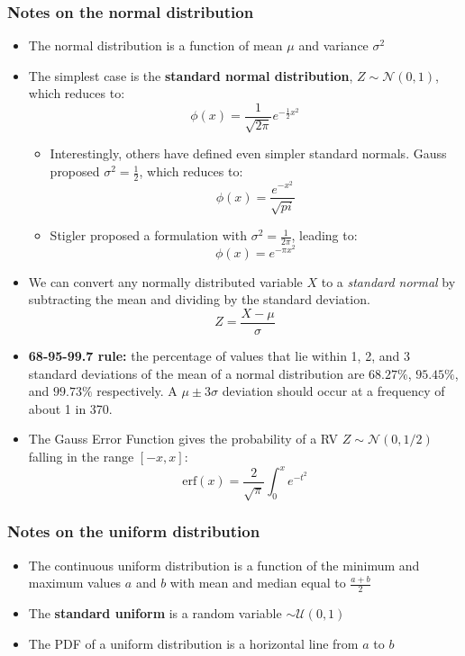 \documentclass{article}
\begin{document}
\begin{multicols*}{2}
\begin{itemize}
\end{itemize}

\subsubsection{Notes on the normal distribution}
\begin{itemize}
    \item The normal distribution is a function of mean $\mu$ and variance $\sigma^2$
    \item The simplest case is the \textbf{standard normal distribution}, $Z \sim \mathcal{N}(0, 1)$, which reduces to:
    $$\phi(x) = \frac{1}{\sqrt{2\pi}}e^{-\frac{1}{2}x^2}$$

    \begin{itemize}
        \item Interestingly, others have defined even simpler standard normals. Gauss proposed $\sigma^2 = \frac{1}{2}$, which reduces to:
        $$\phi(x) = \frac{e^{-x^2}}{\sqrt{pi}}$$

        \item Stigler proposed a formulation with $\sigma^2 = \frac{1}{2\pi}$, leading to:
        $$\phi(x) = e^{-\pi x^2}$$

    \end{itemize}
    \item We can convert any normally distributed variable $X$ to a \emph{standard normal} by subtracting the mean and dividing by the standard deviation.
    $$ Z = \frac{X - \mu}{\sigma} $$
    \item \textbf{68-95-99.7 rule:} the percentage of values that lie within 1, 2, and 3 standard deviations of the mean of a normal distribution are $68.27\%$, $95.45\%$, and $99.73\%$ respectively. A $\mu \pm 3\sigma$ deviation should occur at a frequency of about 1 in 370.
    \item The Gauss Error Function gives the probability of a RV $Z \sim \mathcal{N}(0, 1/2)$ falling in the range $[-x, x]$:
    $$ \mathrm{erf}(x) = \frac{2}{\sqrt{\pi}}\int_{0}^{x}e^{-t^2}$$

\end{itemize}

\subsubsection{Notes on the uniform distribution}
\begin{itemize}
    \item The continuous uniform distribution is a function of the minimum and maximum values  $a$ and $b$ with mean and median equal to $\frac{a+b}{2}$
    \item The \textbf{standard uniform} is a random variable $\sim \mathcal{U}(0, 1)$
    \item The PDF of a uniform distribution is a horizontal line from $a$ to $b$
\end{itemize}


\end{multicols*}
\end{document}
